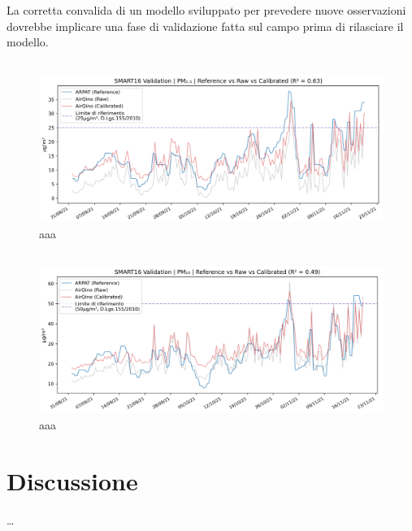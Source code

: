 La corretta convalida di un modello sviluppato per prevedere nuove osservazioni dovrebbe implicare una fase di validazione fatta sul campo prima di rilasciare il modello.

\subsection{}\label{ssec:validazione-pm2.5}

\begin{figure}[H]
\centering
\includegraphics[width=\textwidth,height=\textheight,keepaspectratio]{img/val_pm2.5}
\caption{aaa}
\label{fig:val-pm2.5}
\end{figure}

\subsection{}\label{ssec:validazione-pm10}

\begin{figure}[H]
\centering
\includegraphics[width=\textwidth,height=\textheight,keepaspectratio]{img/val_pm10}
\caption{aaa}
\label{fig:val-pm10}
\end{figure}

\section{Discussione}\label{sec:discussione}
\ldots